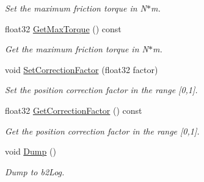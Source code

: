 \begin{DoxyCompactItemize}
\begin{DoxyCompactList}\small\item\em Set the maximum friction torque in N$\ast$m. \end{DoxyCompactList}\item 
float32 \hyperlink{classb2_motor_joint_af84c933978d0a13a242c71a612f4116b}{Get\+Max\+Torque} () const \hypertarget{classb2_motor_joint_af84c933978d0a13a242c71a612f4116b}{}\label{classb2_motor_joint_af84c933978d0a13a242c71a612f4116b}

\begin{DoxyCompactList}\small\item\em Get the maximum friction torque in N$\ast$m. \end{DoxyCompactList}\item 
void \hyperlink{classb2_motor_joint_ae59e624b8a7b6f869ab5e6148352cb52}{Set\+Correction\+Factor} (float32 factor)\hypertarget{classb2_motor_joint_ae59e624b8a7b6f869ab5e6148352cb52}{}\label{classb2_motor_joint_ae59e624b8a7b6f869ab5e6148352cb52}

\begin{DoxyCompactList}\small\item\em Set the position correction factor in the range \mbox{[}0,1\mbox{]}. \end{DoxyCompactList}\item 
float32 \hyperlink{classb2_motor_joint_a9ea99c4280374d85b29d4ab74afd7aff}{Get\+Correction\+Factor} () const \hypertarget{classb2_motor_joint_a9ea99c4280374d85b29d4ab74afd7aff}{}\label{classb2_motor_joint_a9ea99c4280374d85b29d4ab74afd7aff}

\begin{DoxyCompactList}\small\item\em Get the position correction factor in the range \mbox{[}0,1\mbox{]}. \end{DoxyCompactList}\item 
void \hyperlink{classb2_motor_joint_a5d23974c2fc23f64426a8321520e45bb}{Dump} ()\hypertarget{classb2_motor_joint_a5d23974c2fc23f64426a8321520e45bb}{}\label{classb2_motor_joint_a5d23974c2fc23f64426a8321520e45bb}

\begin{DoxyCompactList}\small\item\em Dump to b2\+Log. \end{DoxyCompactList}\end{DoxyCompactItemize}
